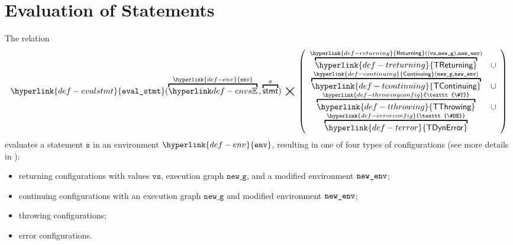 \documentclass{book}
\newcommand\ThrowingConfig[0]{\hyperlink{def-throwingconfig}{\texttt{\#T}}}
\newcommand\ErrorConfig[0]{\hyperlink{def-errorconfig}{\texttt{\#DE}}}
\newcommand\TError[0]{\hyperlink{def-terror}{\textsf{TDynError}}}
\newcommand\TThrowing[0]{\hyperlink{def-tthrowing}{\textsf{TThrowing}}}
\newcommand\TContinuing[0]{\hyperlink{def-tcontinuing}{\textsf{TContinuing}}}
\newcommand\TReturning[0]{\hyperlink{def-treturning}{\textsf{TReturning}}}
\newcommand\evalstmt[1]{\hyperlink{def-evalstmt}{\texttt{eval\_stmt}}(#1)}
\newcommand\Continuing[0]{\hyperlink{def-continuing}{\textsf{Continuing}}}
\newcommand\Returning[0]{\hyperlink{def-returning}{\textsf{Returning}}}
\newcommand\env[0]{\hyperlink{def-env}{\texttt{env}}}
\newcommand\newg[0]{\texttt{new\_g}}
\newcommand\vs[0]{\texttt{s}}
\newcommand\vvs[0]{\texttt{vs}}
\begin{document}

\chapter{Evaluation of Statements \label{chap:eval_stmt}}

The relation
\hypertarget{def-evalstmt}{}
\[
  \evalstmt{\overname{\envs}{\env} \aslsep \overname{\stmt}{\vs}} \;\aslrel\;
  \left(
  \begin{array}{cl}
  \overname{\TReturning}{\Returning((\vvs,\newg), \newenv)} & \cup\\
  \overname{\TContinuing}{\Continuing(\newg,\newenv)} & \cup\\
  \overname{\TThrowing}{\ThrowingConfig} & \cup \\
  \overname{\TError}{\ErrorConfig} &
  \end{array}
  \right)
\]
evaluates a statement $\vs$ in an environment $\env$, resulting in one of four types of configurations
(see more details in ):
\begin{itemize}
  \item returning configurations with values $\vvs$, execution graph $\newg$, and a modified environment $\texttt{new\_env}$;
  \item continuing configurations with an execution graph $\newg$ and modified environment $\texttt{new\_env}$;
  \item throwing configurations;
  \item error configurations.
\end{itemize}
\end{document}
